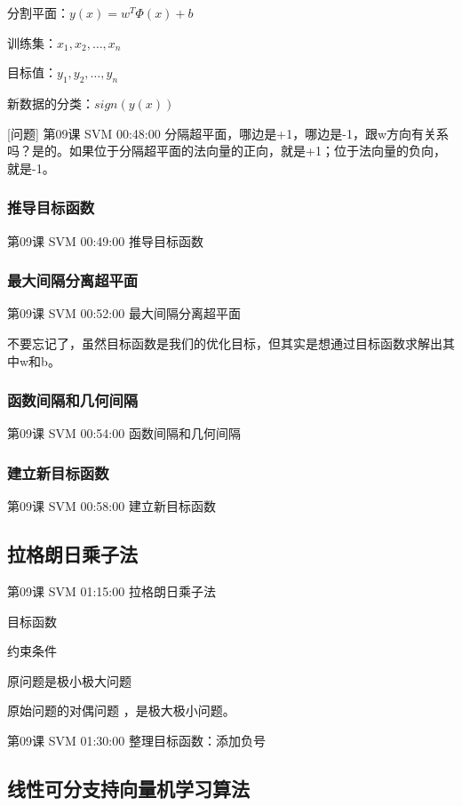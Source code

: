 \documentclass[UTF8]{ctexart}
\begin{document}
分割平面：$y(x)=w^{T} \Phi (x) + b$

训练集：$x_{1},x_{2}, \dots ,x_{n}$

目标值：$y_{1},y_{2}, \dots ,y_{n}$

新数据的分类：$sign(y(x))$

[问题] 第09课 SVM 00:48:00 分隔超平面，哪边是+1，哪边是-1，跟w方向有关系吗？是的。如果位于分隔超平面的法向量的正向，就是+1；位于法向量的负向，就是-1。

\subsubsection{推导目标函数}

第09课 SVM 00:49:00 推导目标函数

\subsubsection{最大间隔分离超平面}

第09课 SVM 00:52:00 最大间隔分离超平面

不要忘记了，虽然目标函数是我们的优化目标，但其实是想通过目标函数求解出其中w和b。

\subsubsection{函数间隔和几何间隔}

第09课 SVM 00:54:00 函数间隔和几何间隔

\subsubsection{建立新目标函数}

第09课 SVM 00:58:00 建立新目标函数

\subsection{拉格朗日乘子法}

第09课 SVM 01:15:00 拉格朗日乘子法

目标函数

约束条件

原问题是极小极大问题

原始问题的对偶问题 ，是极大极小问题。

第09课 SVM 01:30:00 整理目标函数：添加负号

\subsection{线性可分支持向量机学习算法}
\end{document}
